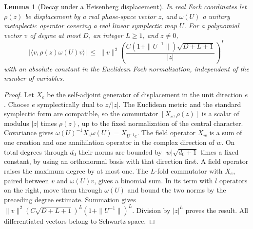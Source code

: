 \documentclass[a4paper,11pt]{article}
\newtheorem{lemma}[proposition]{Lemma}
\theoremstyle{definition}
\theoremstyle{remark}
\numberwithin{equation}{section}
\begin{document}
\begin{lemma}[Decay under a Heisenberg displacement]
\leavevmode\label{lem:oscillatordecay814}
In real Fock coordinates let \(\rho(z)\) be displacement
by a real phase-space vector \(z\), and \(\omega(U)\) a
unitary metaplectic operator covering a real linear
symplectic map \(U\). For a polynomial vector \(v\) of
degree at most \(D\), an integer \(L\ge1\), and \(z\ne0\),
\[
 |\langle v,\rho(z)\omega(U)v\rangle|
 \ \le\ \|v\|^2
 \left(\frac{C(1+\|U^{-1}\|)\sqrt{D+L+1}}{|z|}\right)^L
\]
with an absolute constant in the Euclidean Fock normalization,
independent of the number of variables.
\end{lemma}
\begin{proof}
Let \(X_e\) be the self-adjoint generator of displacement in
the unit direction \(e\). Choose \(e\) symplectically dual
to \(z/|z|\). The Euclidean metric and the standard
symplectic form are compatible, so the commutator
\([X_e,\rho(z)]\) is a scalar of modulus \(|z|\) times
\(\rho(z)\), up to the fixed normalization of the central
character. Covariance gives
\(\omega(U)^{-1}X_e\omega(U)=X_{U^{-1}e}\).
The field operator \(X_w\) is a sum of one creation and
one annihilation operator in the complex direction of \(w\).
On total degrees through \(d_0\) their norms are bounded
by \(|w|\sqrt{d_0+1}\) times a fixed constant, by using
an orthonormal basis with that direction first. A field
operator raises the maximum degree by at most one.
The \(L\)-fold commutator with \(X_e\), paired between
\(v\) and \(\omega(U)v\), gives a binomial sum. In its
term with \(l\) operators on the right, move them through
\(\omega(U)\) and bound the two norms by the preceding
degree estimate. Summation gives
\(\|v\|^2(C\sqrt{D+L+1})^L(1+\|U^{-1}\|)^L\).
Division by \(|z|^L\) proves the result. All differentiated
vectors belong to Schwartz space.
\end{proof}
\end{document}
